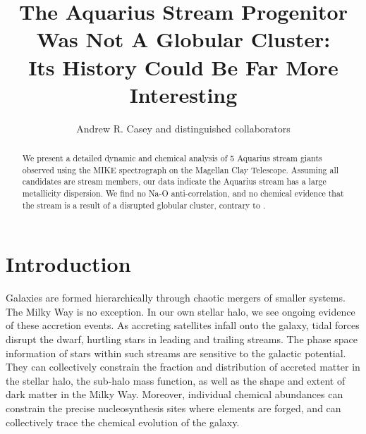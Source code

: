 \documentclass{emulateapj}
\begin{document}
\title{The Aquarius Stream Progenitor Was Not A Globular Cluster: \\ Its History Could Be Far More Interesting}


\author{Andrew R. Casey and distinguished collaborators}


\begin{abstract}
We present a detailed dynamic and chemical analysis of 5 Aquarius stream giants observed using the MIKE spectrograph on the Magellan Clay Telescope. Assuming all candidates are stream members, our data indicate the Aquarius stream has a large metallicity dispersion. We find no Na-O anti-correlation, and no chemical evidence that the stream is a result of a disrupted globular cluster, contrary to \citet{wylie-de-boer;et-al_2012}.

\end{abstract}


\section{Introduction}
Galaxies are formed hierarchically through chaotic mergers of smaller systems. The Milky Way is no exception. In our own stellar  halo, we see ongoing evidence of these accretion events. As accreting satellites infall onto the galaxy, tidal forces disrupt the dwarf, hurtling stars in leading and trailing streams. The phase space information of stars within such streams are sensitive to the galactic potential. They can collectively constrain the fraction and distribution of accreted matter in the stellar halo, the sub-halo mass function, as well as the shape and extent of dark matter in the Milky Way. Moreover, individual chemical abundances can constrain the  precise nucleosynthesis sites where elements are forged, and can collectively trace the chemical evolution of the galaxy.

\end{document}
